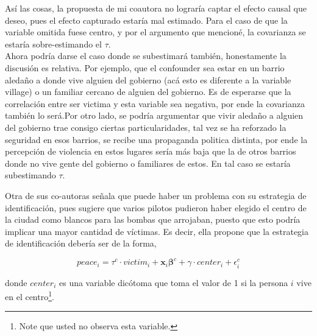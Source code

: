 \documentclass[a4paper, answers, addpoints, 11pt]{exam}
\begin{document}
\begin{enumerate}
\begin{mdframed}
        Así las cosas, la propuesta de mi coautora no lograría captar el efecto causal que deseo, pues el efecto capturado estaría mal estimado. Para el caso de que la variable omitida fuese centro, y por el argumento que mencioné, la covarianza se estaría sobre-estimando el $\tau$.\\
        
        Ahora podría darse el caso donde se subestimará también, honestamente la discusión es relativa. Por ejemplo, que el confounder sea estar en un barrio aledaño a donde vive alguien del gobierno (acá esto es diferente a la variable village) o un familiar cercano de alguien del gobierno. Es de esperarse que la correlación entre ser victima y esta variable sea negativa, por ende la covarianza también lo será.Por otro lado, se podría argumentar que vivir aledaño a alguien del gobierno trae consigo ciertas particularidades, tal vez se ha reforzado la seguridad en esos barrios, se recibe una propaganda politica distinta, por ende la percepción de violencia en estos lugares sería más baja que la de otros barrios donde no vive gente del gobierno o familiares de estos. En tal caso se estaría subestimando $\tau$.
        \end{mdframed}

    
\end{enumerate}

    Otra de sus co-autoras señala que puede haber un problema con su estrategia de identificación, pues sugiere que varios pilotos pudieron haber elegido el centro de la ciudad como blancos para las bombas que arrojaban, puesto que esto podría implicar una mayor cantidad de víctimas. Es decir, ella propone que la estrategia de identificación debería ser de la forma,

    \begin{equation}\label{eq:center}
        peace_i = \tau^{c} \cdot victim_i + \textbf{x}_i\boldsymbol\beta^{c} + \gamma \cdot center_i + \epsilon^{c}_i
    \end{equation}

    donde $center_i$ es una variable dicótoma que toma el valor de 1 si la persona $i$ vive en el centro\footnote{Note que usted no observa esta variable.}. 
\end{document}
